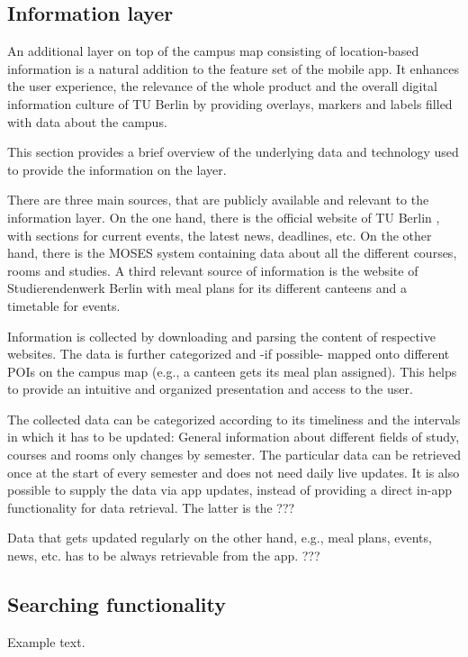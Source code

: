 \subsection{Information layer}
An additional layer on top of the campus map consisting of location-based information is a natural addition to the feature set of the mobile app. It enhances the user experience, the relevance of the whole product and the overall digital information culture of TU Berlin by providing overlays, markers and labels filled with data about the campus.

This section provides a brief overview of the underlying data and technology used to provide the information on the layer.

There are three main sources, that are publicly available and relevant to the information layer. On the one hand, there is the official website of TU Berlin \cite{tu_berlin_main}, with sections for current events, the latest news, deadlines, etc. On the other hand, there is the MOSES system \cite{tu_berlin_moses} containing data about all the different courses, rooms and studies. A third relevant source of information is the website of Studierendenwerk Berlin \cite{studierendenwerk_berlin} with meal plans for its different canteens and a timetable for events.

Information is collected by downloading and parsing the content of respective websites. The data is further categorized and -if possible- mapped onto different POIs on the campus map (e.g., a canteen gets its meal plan assigned). This helps to provide an intuitive and organized presentation and access to the user.

The collected data can be categorized according to its timeliness and the intervals in which it has to be updated: General information about different fields of study, courses and rooms only changes by semester. The particular data can be retrieved once at the start of every semester and does not need daily live updates. It is also possible to supply the data via app updates, instead of providing a direct in-app functionality for data retrieval. The latter is the ???

Data that gets updated regularly on the other hand, e.g., meal plans, events, news, etc. has to be always retrievable from the app. ???

\subsection{Searching functionality}
Example text.
